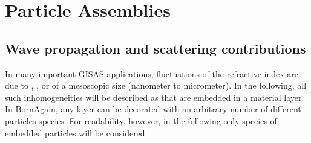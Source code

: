 

\chapter{Particle Assemblies}  \label{sec:Assemblies}


\section{Wave propagation and scattering contributions}

\def\sp{\text{p}}
\def\sm{\text{m}}
\def\mz{\overline{z}}

%
%
%
In many important GISAS applications,
fluctuations of the refractive index are due to
, ,  or 
%
%
%
%
of a mesoscopic size (nanometer to micrometer).
In the following, all such inhomogeneities will be described as
 that are embedded in a material layer.
In BornAgain, any layer can be decorated with an arbitrary number
of different particles species.
For readability, however, in the following
only  species of embedded particles will be considered.

